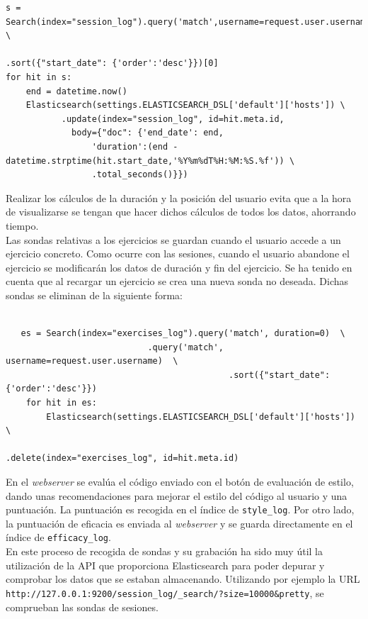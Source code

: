 \begin{lstlisting}
s = Search(index="session_log").query('match',username=request.user.username) \
        														.sort({"start_date": {'order':'desc'}})[0]
for hit in s:
    end = datetime.now()
    Elasticsearch(settings.ELASTICSEARCH_DSL['default']['hosts']) \
           .update(index="session_log", id=hit.meta.id,
             body={"doc": {'end_date': end,
                 'duration':(end - datetime.strptime(hit.start_date,'%Y%m%dT%H:%M:%S.%f')) \ 
                 .total_seconds()}})
\end{lstlisting}

Realizar los cálculos de la duración y la posición del usuario evita que a la hora de visualizarse se tengan que hacer dichos cálculos de todos los datos, ahorrando tiempo.\\
\newpage
Las sondas relativas a los ejercicios se guardan cuando el usuario accede a un ejercicio concreto. Como ocurre con las sesiones, cuando el usuario abandone el ejercicio se modificarán los datos de duración y fin del ejercicio. Se ha tenido en cuenta que al recargar un ejercicio se crea una nueva sonda no deseada. Dichas sondas se eliminan de la siguiente forma:\\
\\
\begin{lstlisting}
   es = Search(index="exercises_log").query('match', duration=0)  \
   				            .query('match', username=request.user.username)  \
        					                .sort({"start_date": {'order':'desc'}})
    for hit in es:
        Elasticsearch(settings.ELASTICSEARCH_DSL['default']['hosts'])  \ 
    				                        .delete(index="exercises_log", id=hit.meta.id)
\end{lstlisting}

En el \textit{webserver} se evalúa el código enviado con el botón de evaluación de estilo, dando unas recomendaciones para mejorar el estilo del código al usuario y una puntuación. La puntuación es recogida en el índice de \texttt{style\_log}. Por otro lado, la puntuación de eficacia es enviada al \textit{webserver} y se guarda directamente en el índice de \texttt{efficacy\_log}. \\

En este proceso de recogida de sondas y su grabación ha sido muy útil la utilización de la API que proporciona Elasticsearch para poder depurar y comprobar los datos que se estaban almacenando. Utilizando por ejemplo la URL    \newline       \texttt{http://127.0.0.1:9200/session\_log/\_search/?size=10000&pretty}, se comprueban las sondas de sesiones.\\
